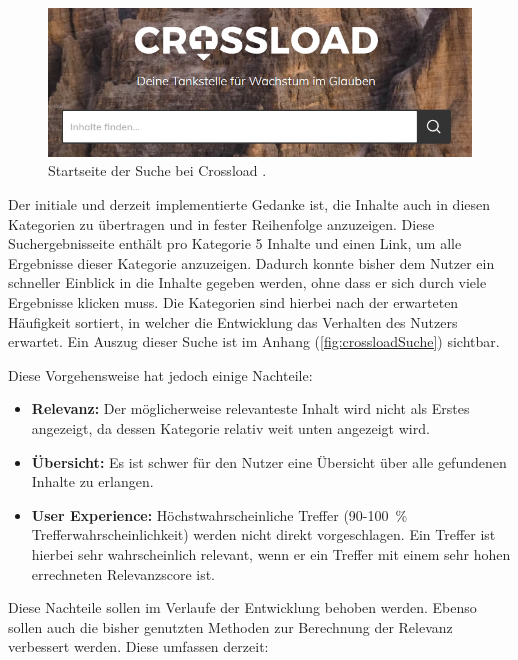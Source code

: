 \begin{figure}[h]
  \begin{centering}
    \includegraphics[width=\textwidth]{figures/foundations/crossloadSucheStart.png}
    \caption{Startseite der Suche bei Crossload \cite{pfleiderer2022}.}
    \label{fig:crossloadSucheStart}
  \end{centering}
\end{figure}

Der initiale und derzeit implementierte Gedanke ist, die Inhalte auch in diesen Kategorien zu übertragen und in fester Reihenfolge anzuzeigen.
Diese Suchergebnisseite enthält pro Kategorie 5 Inhalte und einen Link, um alle Ergebnisse dieser Kategorie anzuzeigen.
Dadurch konnte bisher dem Nutzer ein schneller Einblick in die Inhalte gegeben werden, ohne dass er sich durch viele Ergebnisse klicken muss.
Die Kategorien sind hierbei nach der erwarteten Häufigkeit sortiert, in welcher die Entwicklung das Verhalten des Nutzers erwartet. Ein Auszug dieser Suche ist im Anhang (\ref{fig:crossloadSuche}) sichtbar.

Diese Vorgehensweise hat jedoch einige Nachteile:

\begin{itemize}
  \item \textbf{Relevanz:} Der möglicherweise relevanteste Inhalt wird nicht als Erstes angezeigt, da dessen Kategorie relativ weit unten angezeigt wird.
  \item \textbf{Übersicht:} Es ist schwer für den Nutzer eine Übersicht über alle gefundenen Inhalte zu erlangen.
  \item \textbf{User Experience:} Höchstwahrscheinliche Treffer (90-100 \% Trefferwahrscheinlichkeit) werden nicht direkt vorgeschlagen.
  Ein Treffer ist hierbei sehr wahrscheinlich relevant, wenn er ein Treffer mit einem sehr hohen errechneten Relevanzscore ist.
\end{itemize}

Diese Nachteile sollen im Verlaufe der Entwicklung behoben werden.
Ebenso sollen auch die bisher genutzten Methoden zur Berechnung der Relevanz verbessert werden.
Diese umfassen derzeit:

